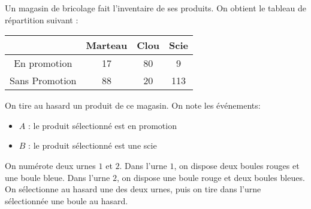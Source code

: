 \documentclass{exam}
\begin{document}
\begin{questions}
\question[6]
Un magasin de bricolage fait l'inventaire de ses produits. On obtient le tableau de répartition suivant :
\begin{center}
\begin{tabular}{|c|c|c|c|}
\hline
&Marteau&Clou&Scie\\
\hline
En promotion&\num{17}&\num{80}&\num{9}\\
\hline
Sans Promotion&\num{88}&\num{20}&\num{113}\\
\hline
\end{tabular}
\end{center}
On tire au hasard un produit de ce magasin. On note les événements:
\begin{itemize}
\item $A$ : \og le produit sélectionné est en promotion \fg
\item $B$ : \og le produit sélectionné est une scie \fg
\end{itemize}
\vspace*{0.5cm}
\vspace*{0.5cm}
\question[4]
On numérote deux urnes $1$ et $2$. Dans l'urne $1$, on dispose deux boules rouges et une boule bleue. Dans l'urne $2$, on dispose une boule rouge et deux boules bleues. On sélectionne au hasard une des deux urnes, puis on tire dans l'urne sélectionnée une boule au hasard.
\begin{parts}

\end{parts}
\end{questions}
\end{document}
